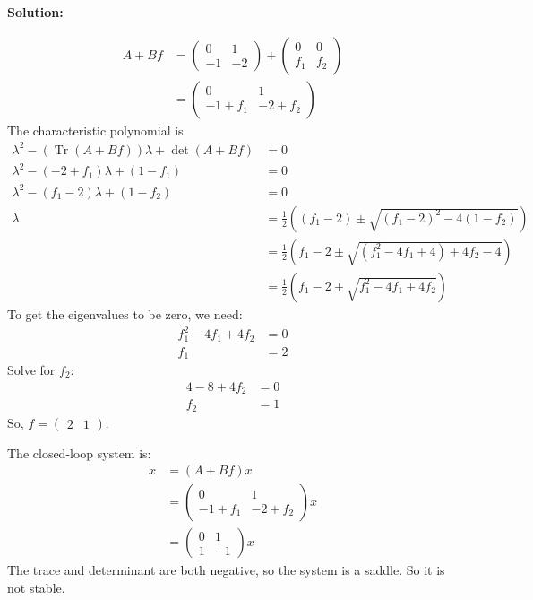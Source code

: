 \documentclass[12pt]{article}
\DeclareMathOperator{\Tr}{Tr}
\newenvironment{solution}{
    \textbf{Solution:}
    
}{
    
    \vspace{2em}
}
\begin{document}
\begin{solution}
    \[
        \begin{aligned}
            A + Bf &= \begin{pmatrix}
                0 & 1\\
                -1 & -2
            \end{pmatrix} + \begin{pmatrix}
                0 & 0\\
                f_1 & f_2
            \end{pmatrix} \\
            &= \begin{pmatrix}
                0 & 1\\
                -1 + f_1 & -2 + f_2
            \end{pmatrix}
        \end{aligned}
    \]
    The characteristic polynomial is
    \[
        \begin{aligned}
            \lambda^2 - (\Tr(A + Bf)) \lambda + \det(A + Bf) &= 0 \\
            \lambda^2 - (-2 + f_1) \lambda + (1 - f_1) &= 0 \\
            \lambda^2 - (f_1 - 2) \lambda + (1 - f_2) &= 0\\
            \lambda &= \frac{1}{2} \left( (f_1 - 2) \pm \sqrt{(f_1 - 2)^2 - 4(1 - f_2)} \right)\\
            &= \frac{1}{2} \left( f_1 - 2 \pm \sqrt{(f_1^2 - 4f_1 + 4) + 4f_2 - 4} \right)\\
            &= \frac{1}{2} \left( f_1 - 2 \pm \sqrt{f_1^2 - 4f_1 + 4f_2} \right)
        \end{aligned}
    \]
    To get the eigenvalues to be zero, we need:
    \[
        \begin{aligned}
            f_1^2 - 4f_1 + 4f_2 &= 0 \\
            f_1 &= 2
        \end{aligned}
    \]
    Solve for \(f_2\):
    \[
        \begin{aligned}
            4 - 8 + 4f_2 &= 0 \\
            f_2 &= 1
        \end{aligned}
    \]
    So, \(f = \begin{pmatrix}
        2 & 1
    \end{pmatrix}\).

    The closed-loop system is:
    \[
        \begin{aligned}
            \dot x &= (A + Bf)x \\
            &= \begin{pmatrix}
                0 & 1\\
                -1 + f_1 & -2 + f_2
            \end{pmatrix}x\\
            &= \begin{pmatrix}
                0 & 1\\
                1 & -1
            \end{pmatrix}x
        \end{aligned}
    \]
    The trace and determinant are both negative, so the system is a saddle. So it is not stable.
\end{solution}
\end{document}

